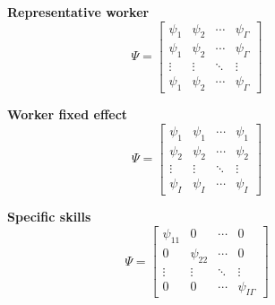 \documentclass[12pt]{article}
\theoremstyle{definition}
\theoremstyle{plain}
\begin{document}
\begin{figure}[!htbp]
	\centering
	\begin{minipage}{0.3\textwidth}
		\centering
		\textbf{Representative worker}
		\[
		\Psi = \begin{bmatrix}
			\psi_{1} 	& \psi_{2}	& \cdots & \psi_{\Gamma}	\\ 
			\psi_{1}	& \psi_{2} 	& \cdots & \psi_{\Gamma}	\\ 
			\vdots 		& \vdots 	& \ddots & \vdots 			\\ 
			\psi_{1}	& \psi_{2}	& \cdots & \psi_{\Gamma}
		\end{bmatrix}
		\]
	\end{minipage}
	\begin{minipage}{0.3\textwidth}
		\centering
		\textbf{Worker fixed effect}
		\[
		\Psi = \begin{bmatrix}
			\psi_{1} 	& \psi_{1}	& \cdots & \psi_{1}		\\ 
			\psi_{2}	& \psi_{2} 	& \cdots & \psi_{2}		\\ 
			\vdots 		& \vdots 	& \ddots & \vdots 		\\ 
			\psi_{I}	& \psi_{I}	& \cdots & \psi_{I}
		\end{bmatrix}
		\]
	\end{minipage}
	\begin{minipage}{.3\textwidth}
		\centering
		\textbf{Specific skills}
		\[
		\Psi = \begin{bmatrix}
			\psi_{11} 	& 0 		& \cdots & 0			\\ 
			0  			& \psi_{22} & \cdots & 0 			\\ 
			\vdots 		& \vdots 	& \ddots & \vdots 		\\ 
			0 			& 0 		& \cdots & \psi_{I\Gamma}
		\end{bmatrix}
		\]
	\end{minipage}%
\end{figure}
\end{document}
